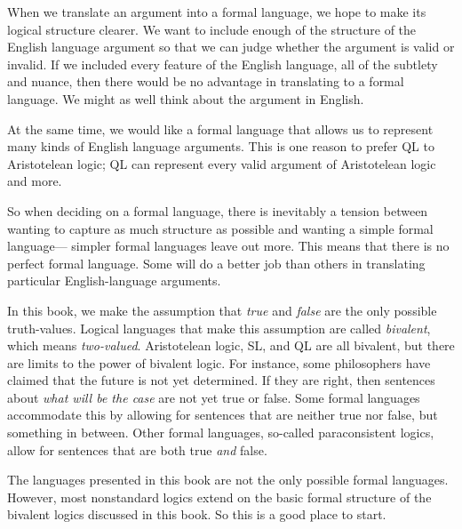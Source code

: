 When we translate an argument into a formal language, we hope to make its logical structure clearer. We want to include enough of the structure of the English language argument so that we can judge whether the argument is valid or invalid. If we included every feature of the English language, all of the subtlety and nuance, then there would be no advantage in translating to a formal language. We might as well think about the argument in English.

At the same time, we would like a formal language that allows us to represent many kinds of English language arguments. This is one reason to prefer QL to Aristotelean logic; QL can represent every valid argument of Aristotelean logic and more.

So when deciding on a formal language, there is inevitably a tension between wanting to capture as much structure as possible and wanting a simple formal language--- simpler formal languages leave out more. This means that there is no perfect formal language. Some will do a better job than others in translating particular English-language arguments.

In this book, we make the assumption that \emph{true} and \emph{false} are the only possible truth-values. Logical languages that make this assumption are called \emph{bivalent}, which means \emph{two-valued}. Aristotelean logic, SL, and QL are all bivalent, but there are limits to the power of bivalent logic. For instance, some philosophers have claimed that the future is not yet determined. If they are right, then sentences about \emph{what will be the case} are not yet true or false.
Some formal languages accommodate this by allowing for sentences that are neither true nor false, but something in between.
Other formal languages, so-called paraconsistent logics, allow for sentences that are both true \emph{and} false.

The languages presented in this book are not the only possible formal languages. However, most nonstandard logics extend on the basic formal structure of the bivalent logics discussed in this book. So this is a good place to start.


